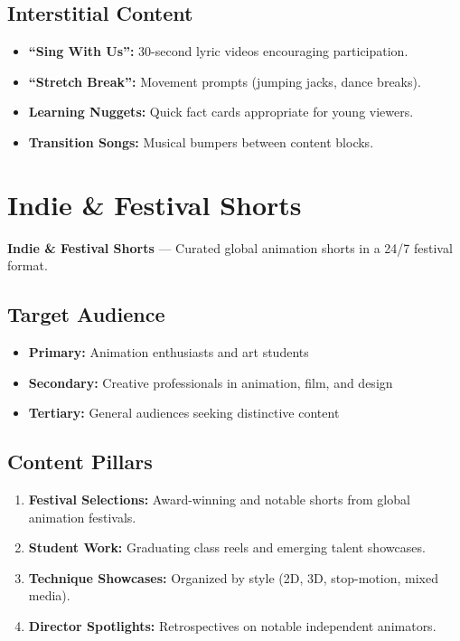 \documentclass[12pt,letterpaper,twoside]{report}
\begin{document}
\subsection{Interstitial Content}

\begin{itemize}[leftmargin=1.5cm]
    \item \textbf{``Sing With Us'':} 30-second lyric videos encouraging participation.
    \item \textbf{``Stretch Break'':} Movement prompts (jumping jacks, dance breaks).
    \item \textbf{Learning Nuggets:} Quick fact cards appropriate for young viewers.
    \item \textbf{Transition Songs:} Musical bumpers between content blocks.
\end{itemize}

\section{Indie \& Festival Shorts}
\label{sec:indie}

\begin{channelbox}[indiegreen]
\textbf{Indie \& Festival Shorts} --- Curated global animation shorts in a 24/7 festival format.
\end{channelbox}

\subsection{Target Audience}

\begin{itemize}[leftmargin=1.5cm]
    \item \textbf{Primary:} Animation enthusiasts and art students
    \item \textbf{Secondary:} Creative professionals in animation, film, and design
    \item \textbf{Tertiary:} General audiences seeking distinctive content
\end{itemize}

\subsection{Content Pillars}

\begin{enumerate}[leftmargin=2cm]
    \item \textbf{Festival Selections:} Award-winning and notable shorts from global animation festivals.
    \item \textbf{Student Work:} Graduating class reels and emerging talent showcases.
    \item \textbf{Technique Showcases:} Organized by style (2D, 3D, stop-motion, mixed media).
    \item \textbf{Director Spotlights:} Retrospectives on notable independent animators.
\end{enumerate}
\end{document}
